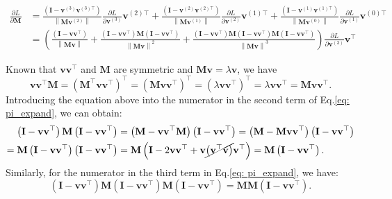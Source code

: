 \documentclass{article}
\newcommand{\bM}{\mathbf{M}}
\newcommand{\bv}{\mathbf{v}}
\newcommand{\bI}{\mathbf{I}}
\begin{document}
	\begin{equation}
	\begin{aligned} 
	\frac{\partial L}{\partial \bM}
	&{=}\frac{\left(\bI-\bv^{(3)} \bv^{(3)\top}\right)}{\left\|\bM \bv^{(2)}\right\|} \frac{\partial L}{\partial \bv^{(3)}} \bv^{(2)\top} +
	\frac{\left(\bI-\bv^{(2)} \bv^{(2)\top}\right)}{\left\|\bM \bv^{(1)}\right\|} \frac{\partial L}{\partial \bv^{(2)}} \bv^{(1)\top} + 
	\frac{\left(\bI-\bv^{(1)} \bv^{(1)\top}\right)}{\left\|\bM \bv^{(0)}\right\|} \frac{\partial L}{\partial \bv^{(1)}} \bv^{(0)\top}\\
	&{=} \left( \frac{\left(\bI {-} \bv \bv^{\top}\right)}{\left\|\bM \bv\right\|} {+}
	 \frac{\left(\bI {-} \bv \bv^{\top}\right) \bM  \left(\bI {-} \bv \bv^{\top}\right)}{\left\|\bM \bv\right\|^{2}}  {+} 
	 \frac{\left(\bI {-} \bv \bv^{\top}\right) \bM \left(\bI {-} \bv \bv^{\top}\right) \bM \left(\bI {-} \bv \bv^{\top}\right)}{\left\|\bM \bv\right\|^{3}} \right)
	 \frac{\partial L}{\partial \bv^{(3)}} \bv^{\top}
	\end{aligned}
	\label{eq: pi_expand}
	\end{equation}
	
	Known that $\bv \bv^{\top}$ and $\bM$ are symmetric and $\bM \bv = \lambda \bv$, we have 
$$\bv\bv^{\top}\bM = (\bM^{\top}\bv\bv^{\top})^{\top} = (\bM\bv\bv^{\top})^{\top} = (\lambda\bv\bv^{\top})^{\top} = \lambda\bv\bv^{\top} = \bM\bv\bv^{\top}.$$
	Introducing the equation above into the numerator in the second term of Eq.\ref{eq: pi_expand}, we can obtain:
	\begin{equation}
	\begin{aligned}
	\left(\bI - \bv \bv^{\top}\right) \bM  \left(\bI - \bv \bv^{\top}\right) &
	= \left(\bM - \bv \bv^{\top}\bM\right) \left(\bI - \bv \bv^{\top}\right) 
	=  \left(\bM - \bM \bv \bv^{\top}\right) \left(\bI - \bv \bv^{\top}\right) \\
	= \bM \left(\bI - \bv \bv^{\top}\right) \left(\bI - \bv \bv^{\top}\right) &
	= \bM \left(\bI - 2\bv \bv^{\top} + \bv \cancel{\left(\bv^{\top}\bv \right)} \bv^{\top}\right) 
	= \bM \left(\bI - \bv \bv^{\top} \right).
	\end{aligned}
	\label{eq: term1}
	\end{equation}
	Similarly, for the numerator in the third term in Eq.\ref{eq: pi_expand}, we have:
	\begin{equation}
	\left(\bI - \bv \bv^{\top}\right) \bM \left(\bI - \bv \bv^{\top}\right) \bM \left(\bI - \bv \bv^{\top}\right) = \bM \bM \left(\bI - \bv \bv^{\top} \right).
	\label{eq: term2}
	\end{equation}
	
\end{document}
